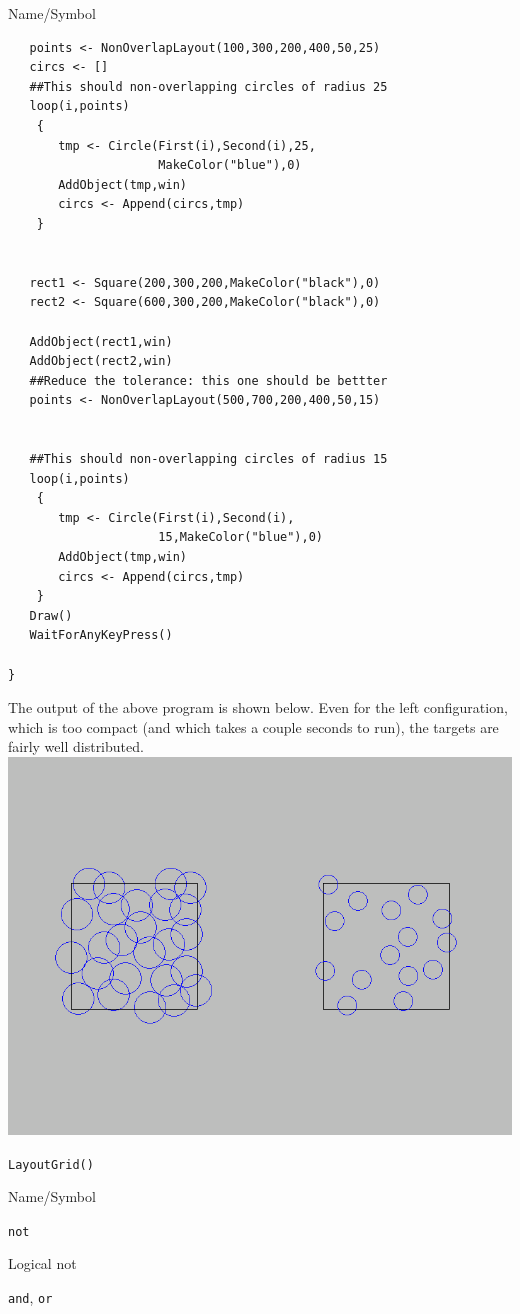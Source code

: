 \begin{desc}{Name/Symbol}
\begin{verbatim}
   points <- NonOverlapLayout(100,300,200,400,50,25)
   circs <- []
   ##This should non-overlapping circles of radius 25
   loop(i,points)
    {
       tmp <- Circle(First(i),Second(i),25,
                     MakeColor("blue"),0) 
       AddObject(tmp,win)
       circs <- Append(circs,tmp)
    }


   rect1 <- Square(200,300,200,MakeColor("black"),0)
   rect2 <- Square(600,300,200,MakeColor("black"),0)

   AddObject(rect1,win)
   AddObject(rect2,win)
   ##Reduce the tolerance: this one should be bettter
   points <- NonOverlapLayout(500,700,200,400,50,15)


   ##This should non-overlapping circles of radius 15
   loop(i,points)
    {
       tmp <- Circle(First(i),Second(i),
                     15,MakeColor("blue"),0) 
       AddObject(tmp,win)
	   circs <- Append(circs,tmp)
    }
   Draw()
   WaitForAnyKeyPress()

}
\end{verbatim}
\clearpage
The output of the above program is shown below.  Even for the left configuration, which is too compact (and which takes a couple seconds to run), the targets are fairly well distributed.
\includegraphics[scale=.35]{images/nonoverlap.png} 


\item[See Also]     
\verb+LayoutGrid()+
\end{desc}





\begin{desc}{Name/Symbol}
\item[Name/Symbol]	\verb+not+

\item[Description]	Logical not

\item[Usage]		

\item[Example]	

\item[See Also]	\verb+and+, \verb+or+
\end{desc}

